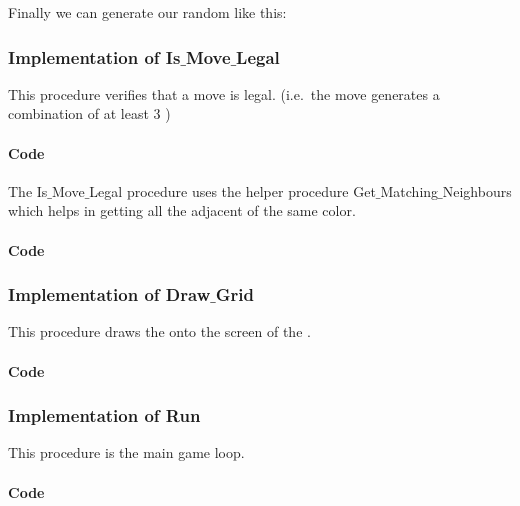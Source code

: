 \noindent
Finally we can generate our random \sqs like this:




\newpage

\subsubsection{Implementation of Is$\_$Move$\_$Legal}

This procedure verifies that a move is legal. (i.e.\  the move generates a combination of at least 3 \sqs)

\paragraph{Code}
\noindent
\begin{centering}

\end{centering}
\newpage

The Is$\_$Move$\_$Legal procedure uses the helper procedure Get$\_$Matching$\_$Neighbours which helps in getting all the adjacent \sqs of the same color.

\paragraph{Code}
\noindent
\begin{centering}

\end{centering}
\newpage

\subsubsection{Implementation of Draw$\_$Grid}

This procedure draws the \grid onto the screen of the \stmdb.

\paragraph{Code}
\noindent
\begin{centering}

\end{centering}
\newpage

\subsubsection{Implementation of Run}

This procedure is the main game loop.

\paragraph{Code}
\begin{centering}

\end{centering}
\newpage

